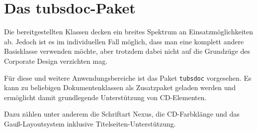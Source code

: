 \chapter{Das tubsdoc-Paket}

Die bereitgestellten Klassen decken ein breites Spektrum an Einsatzmöglichkeiten
ab. Jedoch ist es im individuellen Fall möglich, dass man eine komplett andere
Basisklasse verwenden möchte, aber trotzdem dabei nicht auf die Grundzüge
des Corporate Design verzichten mag.

Für diese und weitere Anwendungsbereiche ist das Paket \lstinline{tubsdoc}
vorgesehen. Es kann zu beliebigen Dokumentenklassen als Zusatzpaket geladen
werden und ermöglicht damit grundlegende Unterstützung von CD-Elementen.

Dazu zählen unter anderem die Schriftart Nexus, die CD-Farbklänge und das
Gauß-Layoutsystem inklusive Titelseiten-Unterstützung.


